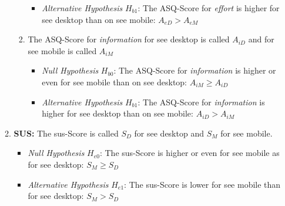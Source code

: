 \begin{enumerate}[{label=\alph*)}]
\begin{enumerate}[label=\roman*)]
\begin{enumerate}[{label=\arabic*)}]
\begin{itemize}
                          \item \textit{Alternative Hypothesis} $H_{b1}$: The \gls{ASQ}-Score for \textit{effort} is higher for \gls{see} desktop than on \gls{see} mobile: $A_{eD} > A_{eM}$
                        \end{itemize}
                  \item The \gls{ASQ}-Score for \textit{information} for \gls{see} desktop is called $A_{iD}$ and for \gls{see} mobile is called $A_{iM}$
                        \begin{itemize}
                          \item \textit{Null Hypothesis} $H_{b0}$: The \gls{ASQ}-Score for \textit{information} is higher or even for \gls{see} mobile than on \gls{see} desktop: $A_{iM} \geq A_{iD}$
                          \item \textit{Alternative Hypothesis} $H_{b1}$: The \gls{ASQ}-Score for \textit{information} is higher for \gls{see} desktop than on \gls{see} mobile: $A_{iD} > A_{iM}$
                        \end{itemize}
                \end{enumerate}

          \item \textbf{SUS:} The \gls{sus}-Score is called $S_D$ for \gls{see} desktop and $S_M$ for \gls{see} mobile.
                \begin{itemize}
                  \item \textit{Null Hypothesis} $H_{e0}$: The \gls{sus}-Score is higher or even for \gls{see} mobile as for \gls{see} desktop: $S_M \geq S_D$
                  \item \textit{Alternative Hypothesis} $H_{e1}$: The \gls{sus}-Score is lower for \gls{see} mobile than for \gls{see} desktop: $S_M > S_D$
                \end{itemize}
        \end{enumerate}
\end{enumerate}

